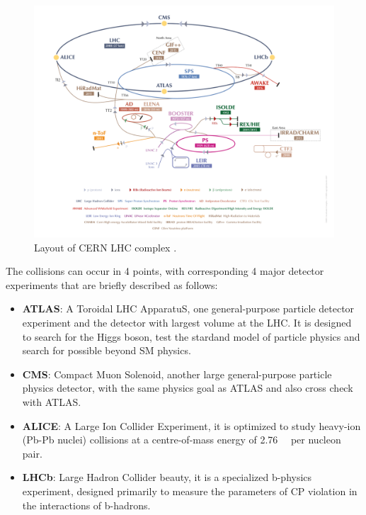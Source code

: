 \begin{figure}[!htb]
  \centering
  \includegraphics[width=1.0\textwidth]{figures/Detector/LHC_v2017.png}
  \caption{Layout of CERN LHC complex \cite{Mobs:2197559}.}
  \label{cern_layout}
\end{figure}

The collisions can occur in 4 points, with corresponding 4 major detector experiments that are briefly described as follows:
\begin{itemize}
	\item \textbf{ATLAS}: A Toroidal LHC ApparatuS, one general-purpose particle detector experiment and the detector with largest volume at the LHC. It is designed to search for the Higgs boson, test the stardand model of particle physics and search for possible beyond SM physics.
	\item \textbf{CMS}: Compact Muon Solenoid, another large general-purpose particle physics detector, with the same physics goal as ATLAS and also cross check with ATLAS.
	\item \textbf{ALICE}: A Large Ion Collider Experiment, it is optimized to study heavy-ion (Pb-Pb nuclei) collisions at a centre-of-mass energy of 2.76~\tev~ per nucleon pair.
	\item \textbf{LHCb}: Large Hadron Collider beauty, it is a specialized b-physics experiment, designed primarily to measure the parameters of CP violation in the interactions of b-hadrons.
\end{itemize}



